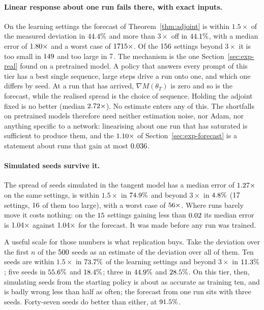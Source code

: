 \paragraph{Linear response about one run fails there, with exact inputs.} On the learning
settings the forecast of Theorem~\ref{thm:adjoint} is within $1.5\times$ of the measured deviation
in $44.4\%$ and more than $3\times$ off in $44.1\%$,
with a median error of $1.80\times$ and a worst case of
$1715\times$. Of the $156$ settings beyond
$3\times$ it is too small in $149$ and too large in $7$.
The mechanism is the one Section~\ref{sec:exp-real} found on a pretrained model. A policy that
answers every prompt of this tier has a best single sequence, large steps drive a run onto one,
and which one differs by seed. At a run that has arrived, $\nabla M(\theta_T)$ is zero and so is
the forecast, while the realised spread is the choice of sequence. Holding the adjoint fixed is no
better (median $2.72\times$). No estimate enters any of this. The shortfalls on
pretrained models therefore need neither estimation noise, nor Adam, nor anything specific to a
network: linearising about one run that has saturated is sufficient to produce them, and the
$1.10\times$ of Section~\ref{sec:exp-forecast} is a statement about runs that gain
at most $0.036$.

\paragraph{Simulated seeds survive it.} The spread of seeds simulated in the tangent model has a
median error of $1.27\times$ on the same settings, is within $1.5\times$ in
$74.9\%$ and beyond $3\times$ in $4.8\%$
($17$ settings, $16$ of them too large), with a
worst case of $56\times$. Where runs barely move it costs nothing: on the
$15$ settings gaining less than $0.02$ its median error
is $1.04\times$ against $1.04\times$
for the forecast. It was made before any run was trained.

A useful scale for those numbers is what replication buys. Take the deviation over the first $n$
of the $500$ seeds as an estimate of the deviation over all of them. Ten seeds are
within $1.5\times$ in $73.7\%$ of the learning settings and beyond $3\times$ in
$11.3\%$; five seeds in $55.6\%$ and
$18.4\%$; three in $44.9\%$ and
$28.5\%$. On this tier, then, simulating seeds from the starting policy is
about as accurate as training ten, and is badly wrong less than half as often; the forecast from
one run sits with three seeds. Forty-seven seeds do better than either, at
$91.5\%$.

